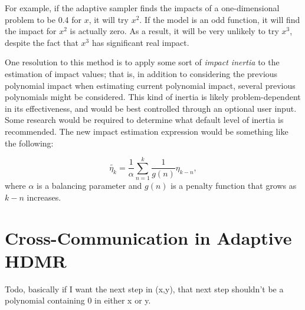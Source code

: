 For example, if the adaptive sampler finds the impacts of a one-dimensional problem to be 0.4 for $x$, it will
try $x^2$.  If the model is an odd function, it will find the impact for $x^2$ is actually zero.  As a result,
it will be very unlikely to try $x^3$, despite the fact that $x^3$ has significant real impact.

One resolution to this method is to apply some sort of \emph{impact inertia} to the estimation of impact
values; that is, in addition to considering the previous polynomial impact when estimating current polynomial
impact, several previous polynomials might be considered.  This kind of inertia is likely problem-dependent in
its effectiveness, and would be best controlled through an optional user input.  Some research would be
required to determine what default level of inertia is recommended.  The new impact estimation expression
would be something like the following:

\begin{equation}
  \tilde{\eta_k}= \frac{1}{\alpha}\sum_{n=1}^k \frac{1}{g(n)}\eta_{k-n},
\end{equation}
where $\alpha$ is a balancing parameter and $g(n)$ is a penalty function that grows as $k-n$ increases.

\section{Cross-Communication in Adaptive HDMR}
Todo, basically if I want the next step in (x,y), that next step shouldn't be a polynomial containing 0 in
either x or y.
